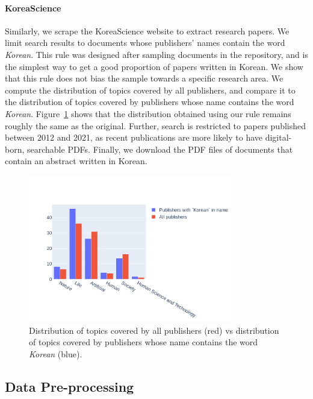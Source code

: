\paragraph{KoreaScience}

Similarly, we scrape the KoreaScience website to extract research papers. We limit search results to documents whose publishers’ names contain the word \emph{Korean}. This rule was designed after sampling documents in the repository, and is the simplest way to get a good proportion of papers written in Korean. We show that this rule does not bias the sample towards a specific research area. We compute the distribution of topics covered by all publishers, and compare it to the distribution of topics covered by publishers whose name contains the word \textit{Korean}. Figure~\ref{fig:chapter5-distr-koreascience-topics} shows that the distribution obtained using our rule remains roughly the same as the original. Further, search is restricted to papers published between 2012 and 2021, as recent publications are more likely to have digital-born, searchable PDFs. Finally, we download the PDF files of documents that contain an abstract written in Korean. 

\begin{figure}[ht]
\centering
    \includegraphics[width=0.8\textwidth]{images/chapter5/koreascience_topic_distr.pdf}
  \caption{Distribution of topics covered by all publishers (red) vs distribution of topics covered by publishers whose name contains the word \textit{Korean} (blue).}
  \label{fig:chapter5-distr-koreascience-topics}
\end{figure}

\subsection{Data Pre-processing}

